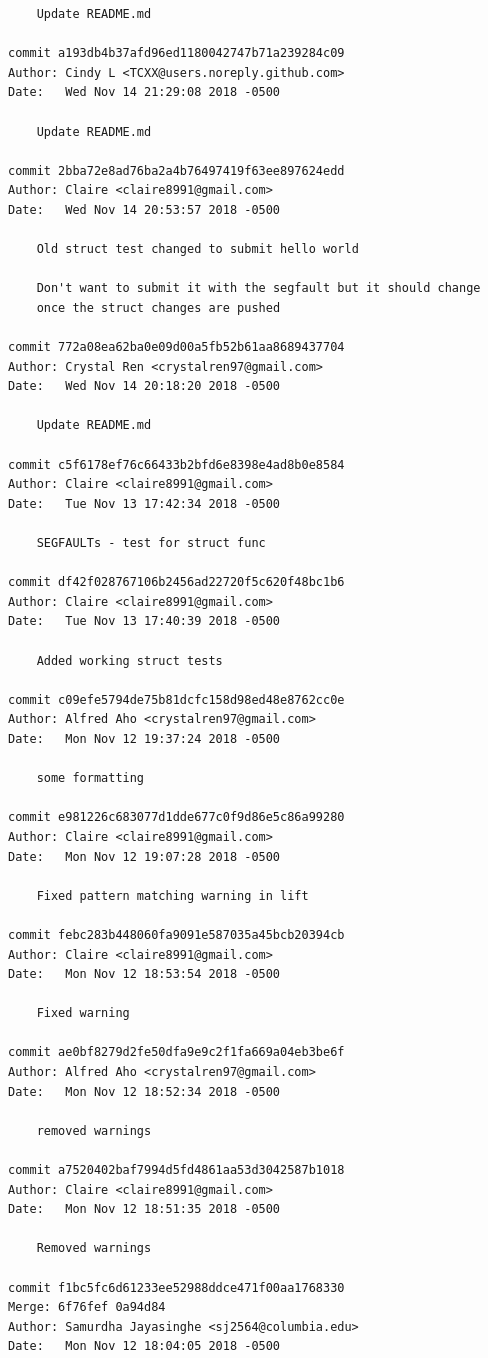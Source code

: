 \documentclass[12pt]{article}
\begin{document}
\begin{lstlisting}
    Update README.md

commit a193db4b37afd96ed1180042747b71a239284c09
Author: Cindy L <TCXX@users.noreply.github.com>
Date:   Wed Nov 14 21:29:08 2018 -0500

    Update README.md

commit 2bba72e8ad76ba2a4b76497419f63ee897624edd
Author: Claire <claire8991@gmail.com>
Date:   Wed Nov 14 20:53:57 2018 -0500

    Old struct test changed to submit hello world
    
    Don't want to submit it with the segfault but it should change
    once the struct changes are pushed

commit 772a08ea62ba0e09d00a5fb52b61aa8689437704
Author: Crystal Ren <crystalren97@gmail.com>
Date:   Wed Nov 14 20:18:20 2018 -0500

    Update README.md

commit c5f6178ef76c66433b2bfd6e8398e4ad8b0e8584
Author: Claire <claire8991@gmail.com>
Date:   Tue Nov 13 17:42:34 2018 -0500

    SEGFAULTs - test for struct func

commit df42f028767106b2456ad22720f5c620f48bc1b6
Author: Claire <claire8991@gmail.com>
Date:   Tue Nov 13 17:40:39 2018 -0500

    Added working struct tests

commit c09efe5794de75b81dcfc158d98ed48e8762cc0e
Author: Alfred Aho <crystalren97@gmail.com>
Date:   Mon Nov 12 19:37:24 2018 -0500

    some formatting

commit e981226c683077d1dde677c0f9d86e5c86a99280
Author: Claire <claire8991@gmail.com>
Date:   Mon Nov 12 19:07:28 2018 -0500

    Fixed pattern matching warning in lift

commit febc283b448060fa9091e587035a45bcb20394cb
Author: Claire <claire8991@gmail.com>
Date:   Mon Nov 12 18:53:54 2018 -0500

    Fixed warning

commit ae0bf8279d2fe50dfa9e9c2f1fa669a04eb3be6f
Author: Alfred Aho <crystalren97@gmail.com>
Date:   Mon Nov 12 18:52:34 2018 -0500

    removed warnings

commit a7520402baf7994d5fd4861aa53d3042587b1018
Author: Claire <claire8991@gmail.com>
Date:   Mon Nov 12 18:51:35 2018 -0500

    Removed warnings

commit f1bc5fc6d61233ee52988ddce471f00aa1768330
Merge: 6f76fef 0a94d84
Author: Samurdha Jayasinghe <sj2564@columbia.edu>
Date:   Mon Nov 12 18:04:05 2018 -0500


\end{lstlisting}
\end{document}
